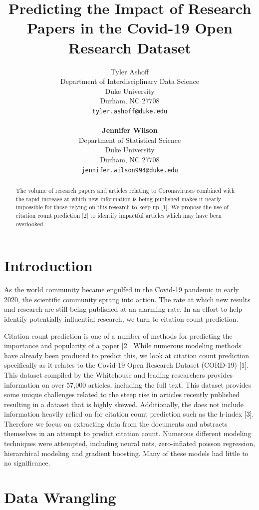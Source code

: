 \documentclass{article} %
\title{Predicting the Impact of Research Papers in the Covid-19 Open Research Dataset}
\author{
Tyler Ashoff \\
Department of Interdisciplinary Data Science\\
Duke University\\
Durham, NC 27708 \\
\texttt{tyler.ashoff@duke.edu} \\
\\
\textbf{Jennifer Wilson} \\
Department of Statistical Science\\
Duke University\\
Durham, NC 27708 \\
\texttt{jennifer.wilson994@duke.edu} \\
}
\begin{document}
\maketitle



\begin{abstract}
The volume of research papers and articles relating to Coronaviruses combined with the rapid increase at which new information is being published makes it nearly impossible for those relying on this research to keep up [1]. We propose the use of citation count prediction [2] to identify impactful articles which may have been overlooked.
\end{abstract}

\section{Introduction}

As the world community became engulfed in the Covid-19 pandemic in early 2020, the scientific community sprang into action. The rate at which new results and research are still being published at an alarming rate. In an effort to help identify potentially influential research, we turn to citation count prediction.

Citation count prediction is one of a number of methods for predicting the importance and popularity of a paper [2]. While numerous modeling methods have already been produced to predict this, we look at citation count prediction specifically as it relates to the Covid-19 Open Research Dataset (CORD-19) [1]. This dataset compiled by the Whitehouse and leading researchers provides information on over 57,000 articles, including the full text. This dataset provides some unique challenges related to the steep rise in articles recently published resulting in a dataset that is highly skewed. Additionally, the does not include information heavily relied on for citation count prediction such as the h-index [3]. Therefore we focus on extracting data from the documents and abstracts themselves in an attempt to predict citation count. Numerous different modeling techniques were attempted, including neural nets, zero-inflated poisson regression, hierarchical modeling and gradient boosting. Many of these models had little to no significance. 

\section{Data Wrangling}
\label{headings}
\end{document}
